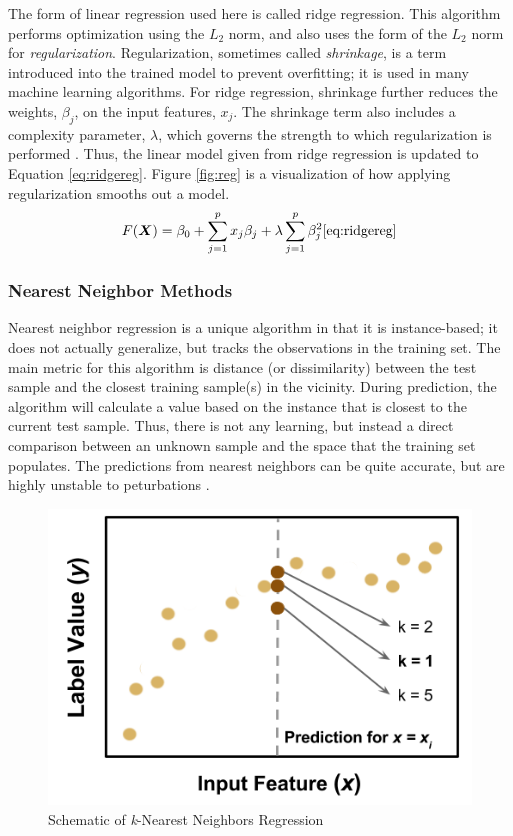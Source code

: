 The form of linear regression used here is called ridge regression. This
algorithm performs optimization using the $L_2$ norm, and also uses the form of
the $L_2$ norm for \textit{regularization}. Regularization, sometimes called
\textit{shrinkage}, is a term introduced into the trained model to prevent
overfitting; it is used in many machine learning algorithms. For ridge
regression, shrinkage further reduces the weights, $\beta_j$, on the input
features, $x_j$. The shrinkage term also includes a complexity parameter,
$\lambda$, which governs the strength to which regularization is performed
\cite{elements_stats}. Thus, the linear model given from ridge regression
is updated to Equation \ref{eq:ridgereg}.  Figure \ref{fig:reg} is a
visualization of how applying regularization smooths out a model.
\begin{equation}
  F(\boldsymbol{X}) = \beta_{0} +  \sum_{j=1}^{p} x_{j} \beta_{j} + \lambda \sum_{j=1}^{p} \beta_{j}^2
  \ref{eq:ridgereg}
\end{equation}

\subsubsection{Nearest Neighbor Methods}
\label{sec:neighbor}

Nearest neighbor regression is a unique algorithm in that it is instance-based;
it does not actually generalize, but tracks the observations in the training
set.  The main metric for this algorithm is distance (or dissimilarity) between
the test sample and the closest training sample(s) in the vicinity.  During
prediction, the algorithm will calculate a value based on the instance that is
closest to the current test sample. Thus, there is not any learning, but
instead a direct comparison between an unknown sample and the space that the
training set populates. The predictions from nearest neighbors can be quite
accurate, but are highly unstable to peturbations \cite{elements_stats}.

\begin{figure}[!htb]
  \centering
  \includegraphics[width=0.8\linewidth]{./chapters/litrev/nn-fig.png}
  \caption{Schematic of \textit{k}-Nearest Neighbors Regression}
  \label{fig:nn}
\end{figure}

